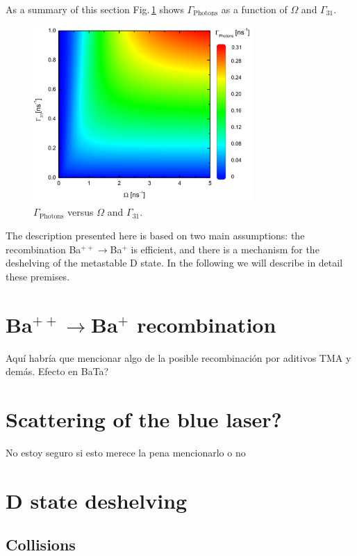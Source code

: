 As a summary of this section Fig.\,\ref{3Dgraph} shows $\Gamma_{\text{Photons}}$ as a function of $\Omega$ and $\Gamma_{31}$.
\begin{figure}[ht!]
\begin{center}
\includegraphics[width=8.3cm, height=6.7cm]{imgs/3Dgraph.pdf}
\caption{\label{3Dgraph} $\Gamma_{\text{Photons}}$ versus $\Omega$ and $\Gamma_{31}$.}
\end{center}
\end{figure}

The description presented here is based on two main assumptions: the recombination Ba$^{++}\rightarrow$Ba$^+$ is efficient, and there is a mechanism for the deshelving of the metastable D state. In the following we will describe in detail these premises.

\section{Ba$^{++}\rightarrow$Ba$^+$ recombination}

Aquí habría que mencionar algo de la posible recombinación por aditivos TMA y demás. Efecto en BaTa?

\section{Scattering of the blue laser?}

No estoy seguro si esto merece la pena mencionarlo o no

\section{D state deshelving}

\subsection{Collisions}
\label{Subcol}


